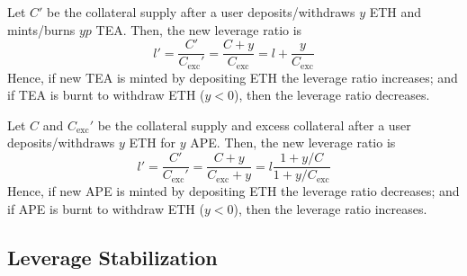 \documentclass[journal,letterpaper,oneside,onecolumn,12pt]{IEEEtran}
\begin{document}
	Let $C'$ be the collateral supply after a user deposits/withdraws $y$ ETH and mints/burns $yp$ TEA. Then, the new leverage ratio is
	\begin{equation}
		l' = \frac{C'}{C_\text{exc}'} = \frac{C+y}{C_\text{exc}} = l +\frac{y}{C_\text{exc}}
	\end{equation}
	Hence, if new TEA is minted by depositing ETH the leverage ratio increases; and if TEA is burnt to withdraw ETH ($y<0$), then the leverage ratio decreases.

	Let $C$ and $C_\text{exc}'$ be the collateral supply and excess collateral after a user deposits/withdraws $y$ ETH for $y$ APE. Then, the new leverage ratio is
	\begin{equation}
		l' = \frac{C'}{C_\text{exc}'} = \frac{C+y}{C_\text{exc}+y} = l \frac{1+y/C}{1+y/C_\text{exc}}
	\end{equation}
	Hence, if new APE is minted by depositing ETH the leverage ratio decreases; and if APE is burnt to withdraw ETH ($y<0$), then the leverage ratio increases.
	
	
	
	
	\subsection{Leverage Stabilization} \label{sec:leverage:stabilization}
\end{document}
